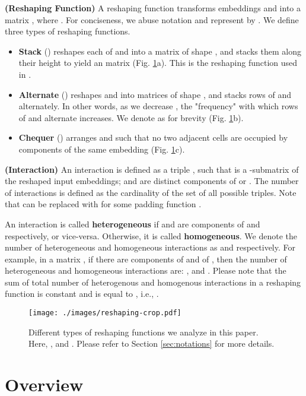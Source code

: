 \documentclass[11pt,a4paper]{article}
\begin{document}
\theoremstyle{definition}
\begin{definition}{\textbf{(Reshaping Function)}}
	\label{def:reshape_func}
	A reshaping function  transforms embeddings  and  into a matrix , where . For conciseness, we abuse notation and represent  by . We define three types of reshaping functions.

	\begin{itemize}[itemsep=3pt,parsep=3pt,partopsep=3pt,leftmargin=10pt,topsep=3pt]
		\item \textbf{Stack} () reshapes each of  and  into a matrix of shape , and stacks them along their height to yield an  matrix (Fig. \ref{fig:reshaping}a). This is the reshaping function used in \citet{conve}.
		\item \textbf{Alternate} () reshapes  and  into matrices of shape , and stacks  rows of  and  alternately. In other words, as we decrease , the "frequency" with which rows of  and  alternate increases. We denote  as  for brevity (Fig. \ref{fig:reshaping}b).
		\item \textbf{Chequer} () arranges  and  such that no two adjacent cells are occupied by components of the same embedding (Fig. \ref{fig:reshaping}c).
	\end{itemize}
\end{definition}

\begin{definition}{\textbf{(Interaction)}}
	\label{def:interactions}
	An interaction is defined as a triple , such that  is a -submatrix of the reshaped input embeddings;  and are distinct components of  or .
	The number of interactions  is defined as the cardinality of the set of all possible triples. Note that  can be replaced with  for some padding function .

	An interaction  is called \textbf{heterogeneous} if  and  are components of  and  respectively, or vice-versa. Otherwise, it is called \textbf{homogeneous}. We denote the number of heterogeneous and homogeneous interactions as   and  respectively. For example, in a  matrix , if there are  components of  and  of , then the number of heterogeneous and homogeneous interactions are: , and . Please note that the sum of total number of heterogenous and homogenous interactions in a reshaping function is constant and is equal to , i.e., .
	
\end{definition}


\begin{figure}[t]
	\centering
	\texttt{[image: ./images/reshaping-crop.pdf]}
	\caption{\label{fig:reshaping}Different types of reshaping functions we analyze in this paper. Here, , and . Please refer to Section \ref{sec:notations}	for more details.}
\end{figure} \section{\method{} Overview}
\label{sec:overview}
\end{document}
